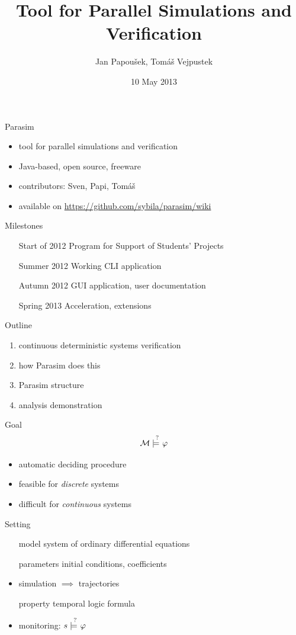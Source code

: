 \documentclass[xcolor=svgnames,14pt]{beamer}
\title[Parasim]{Tool for Parallel Simulations and Verification}
\author{Jan Papou\v{s}ek, Tom\'{a}\v{s} Vejpustek}
\institute{}
\date{10 May 2013}
\newcommand{\qmodels}{\models\hspace{-1.7ex}\raisebox{2.7mm}{\scriptsize?}\hspace{1ex}}
\begin{document}
\frame[plain]{\titlepage}

\begin{frame}{Parasim}%
	\begin{itemize}
		\item tool for parallel simulations and verification
		\item Java-based, open source, freeware
		\item contributors: Sven, Papi, Tom\'{a}\v{s}
		\item available on \mbox{\url{https://github.com/sybila/parasim/wiki}}
	\end{itemize}
\end{frame}%
\begin{frame}{Milestones}%
	\begin{itemize}
		\setlength\itemindent{20mm}
		\item[Start of 2012] Program for Support of Students' Projects
		\item[Summer 2012] Working CLI application
		\item[Autumn 2012] GUI application, user documentation
		\item[Spring 2013] Acceleration, extensions
	\end{itemize}
\end{frame}%
\begin{frame}{Outline}%
	\begin{enumerate}
		\item continuous deterministic systems verification
		\item how Parasim does this
		\item Parasim structure
		\item analysis demonstration
	\end{enumerate}
\end{frame}%
\begin{frame}{Goal}%
	$$\mathcal{M}\qmodels\varphi$$
	\begin{itemize}
		\item automatic deciding procedure
		\item feasible for \emph{discrete} systems
		\item difficult for \emph{continuous} systems
	\end{itemize}
\end{frame}%
\begin{frame}{Setting}%
	\begin{itemize}
		\setlength\itemindent{15mm}
		\item[model] system of ordinary differential equations
		\item[parameters] initial conditions, coefficients
		\item simulation $\implies$ trajectories
		\item[property] temporal logic formula
		\item monitoring: $s\qmodels\varphi$
	\end{itemize}
\end{frame}%
\end{document}
